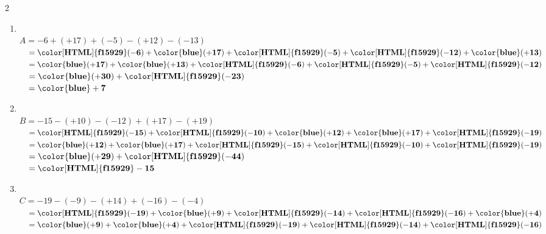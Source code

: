 \begin{corrige}
    \phantom{rrr}    
    \begin{multicols}2
        \begin{enumerate}
            \item \phantom{rrr}\\
            $ A =  -6+(+17)+(-5)-(+12)-(-13)$\\
            $ \phantom{A}= \mathbf{{\color[HTML]{f15929}(-6)}}+\mathbf{{\color{blue}(+17)}}+\mathbf{{\color[HTML]{f15929}(-5)}}+\mathbf{{\color[HTML]{f15929}(-12)}}+\mathbf{{\color{blue}(+13)}} $\\
            $ \phantom{A}= \mathbf{{\color{blue}(+17)}}+\mathbf{{\color{blue}(+13)}}+\mathbf{{\color[HTML]{f15929}(-6)}}+\mathbf{{\color[HTML]{f15929}(-5)}}+\mathbf{{\color[HTML]{f15929}(-12)}} $\\
            $ \phantom{A}= \mathbf{{\color{blue}(+30)}}+\mathbf{{\color[HTML]{f15929}(-23)}} $\\
            $ \phantom{A}= \mathbf{{\color{blue}+7}} $\\
            \item \phantom{rrr}\\
            $ B =  -15-(+10)-(-12)+(+17)-(+19)$\\
            $ \phantom{A}= \mathbf{{\color[HTML]{f15929}(-15)}}+\mathbf{{\color[HTML]{f15929}(-10)}}+\mathbf{{\color{blue}(+12)}}+\mathbf{{\color{blue}(+17)}}+\mathbf{{\color[HTML]{f15929}(-19)}} $\\
            $ \phantom{A}= \mathbf{{\color{blue}(+12)}}+\mathbf{{\color{blue}(+17)}}+\mathbf{{\color[HTML]{f15929}(-15)}}+\mathbf{{\color[HTML]{f15929}(-10)}}+\mathbf{{\color[HTML]{f15929}(-19)}} $\\
            $ \phantom{A}= \mathbf{{\color{blue}(+29)}}+\mathbf{{\color[HTML]{f15929}(-44)}} $\\
            $ \phantom{A}= \mathbf{{\color[HTML]{f15929}-15}} $\\
            \item \phantom{rrr}\\
            $ C =  -19-(-9)-(+14)+(-16)-(-4)$\\
            $ \phantom{A}= \mathbf{{\color[HTML]{f15929}(-19)}}+\mathbf{{\color{blue}(+9)}}+\mathbf{{\color[HTML]{f15929}(-14)}}+\mathbf{{\color[HTML]{f15929}(-16)}}+\mathbf{{\color{blue}(+4)}} $\\
            $ \phantom{A}= \mathbf{{\color{blue}(+9)}}+\mathbf{{\color{blue}(+4)}}+\mathbf{{\color[HTML]{f15929}(-19)}}+\mathbf{{\color[HTML]{f15929}(-14)}}+\mathbf{{\color[HTML]{f15929}(-16)}} $\\

\end{enumerate}
\end{multicols}
\end{corrige}

